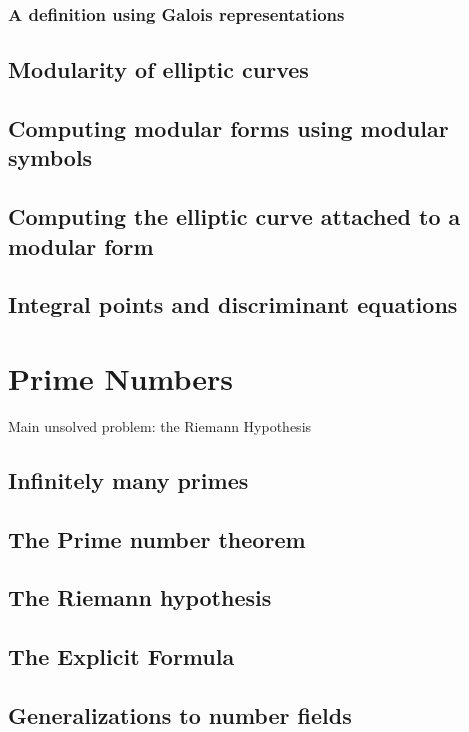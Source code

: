 \documentclass{book}
\begin{document}
\subsection{A definition using Galois representations}




\section{Modularity of elliptic curves}

\section{Computing modular forms using modular symbols}

\section{Computing the elliptic curve attached to a modular form}

\section{Integral points and discriminant equations}



\chapter{Prime Numbers}

Main unsolved problem: the Riemann Hypothesis



\section{Infinitely many primes}
\section{The Prime number theorem}
\section{The Riemann hypothesis}
\section{The Explicit Formula}
\section{Generalizations to number fields}
\end{document}
